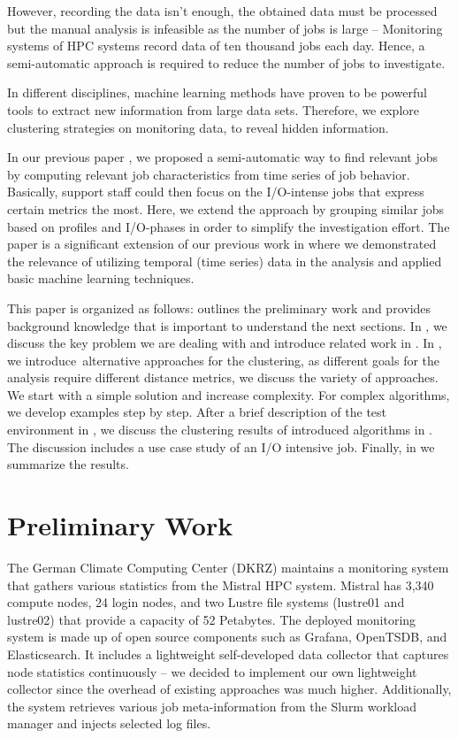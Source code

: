 \documentclass{jhps}
\begin{document}
However, recording the data isn't enough, the obtained data must be processed but the manual analysis is infeasible as the number of jobs is large -- Monitoring systems of HPC systems record data of ten thousand jobs each day.
Hence, a semi-automatic approach is required to reduce the number of jobs to investigate.

In different disciplines, machine learning methods have proven to be powerful tools to extract new information from large data sets.
Therefore, we explore clustering strategies on monitoring data, to reveal hidden information.

In our previous paper \cite{iocats2020}, we proposed a semi-automatic way to find relevant jobs by computing relevant job characteristics from time series of job behavior.
Basically, support staff could then focus on the I/O-intense jobs that express certain metrics the most.
Here, we extend the approach by grouping similar jobs based on profiles and I/O-phases in order to simplify the investigation effort.
The paper is a significant extension of our previous work in \cite{itb2020} where we demonstrated the relevance of utilizing temporal (time series) data in the analysis and applied basic machine learning techniques.

This paper is organized as follows:  outlines the preliminary work and provides background knowledge that is important to understand the next sections.
In , we discuss the key problem we are dealing with and introduce related work in .
In , we introduce\ alternative approaches for the clustering, as different goals for the analysis require different distance metrics, we discuss the variety of approaches.
We start with a simple solution and increase complexity.
For complex algorithms, we develop examples step by step.
After a brief description of the test environment in , we discuss the clustering results of introduced algorithms in .
The discussion includes a use case study of an I/O intensive job.
Finally, in  we summarize the results.

\section{Preliminary Work}%
\label{sec:preliminary_work}
The German Climate Computing Center (DKRZ) maintains a monitoring system that gathers various statistics from the Mistral HPC system.
Mistral has 3,340 compute nodes, 24 login nodes, and two Lustre file systems (lustre01 and lustre02) that provide a capacity of 52 Petabytes.
The deployed monitoring system is made up of open source components such as Grafana, OpenTSDB, and Elasticsearch.
It includes a lightweight self-developed data collector that captures node statistics continuously -- we decided to implement our own lightweight collector since the overhead of existing approaches was much higher.
Additionally, the system retrieves various job meta-information from the Slurm workload manager and injects selected log files.
\end{document}
